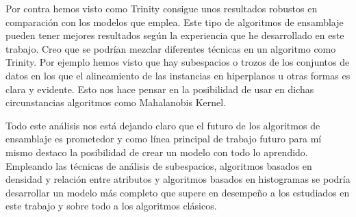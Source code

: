 Por contra hemos visto como Trinity consigue unos resultados robustos en comparación con los modelos que emplea. Este tipo de algoritmos de ensamblaje pueden tener mejores resultados según la experiencia que he desarrollado en este trabajo. Creo que se podrían mezclar diferentes técnicas en un algoritmo como Trinity. Por ejemplo hemos visto que hay subespacios o trozos de los conjuntos de datos en los que el alineamiento de las instancias en hiperplanos u otras formas es clara y evidente. Esto nos hace pensar en la posibilidad de usar en dichas circunstancias algoritmos como Mahalanobis Kernel. 

Todo este análisis nos está dejando claro que el futuro de los algoritmos de ensamblaje es prometedor y como línea principal de trabajo futuro para mí mismo destaco la posibilidad de crear un modelo con todo lo aprendido. Empleando las técnicas de análisis de subespacios, algoritmos basados en densidad y relación entre atributos y algoritmos basados en histogramas se podría desarrollar un modelo más completo que supere en desempeño a los estudiados en este trabajo y sobre todo a los algoritmos clásicos.
